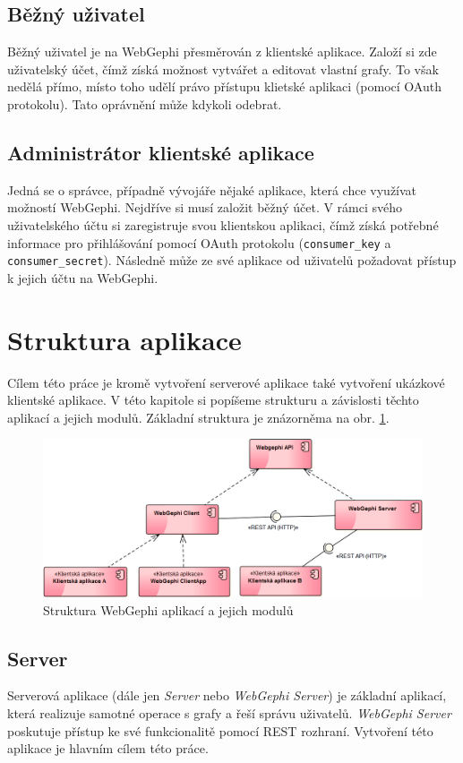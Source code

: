 \documentclass[thesis=M,czech]{FITthesis}[2014/05/6]
\begin{document}
\subsection{Běžný uživatel}
Běžný uživatel je na WebGephi přesměrován z klientské aplikace. Založí si zde uživatelský účet, čímž získá možnost vytvářet a editovat vlastní grafy. To však nedělá přímo,
místo toho udělí právo  přístupu klietské aplikaci (pomocí OAuth protokolu). Tato oprávnění může kdykoli odebrat.

\subsection{Administrátor klientské aplikace}
Jedná se o správce, případně vývojáře nějaké aplikace, která chce využívat možností WebGephi. Nejdříve si musí založit běžný účet. V rámci svého
uživatelského účtu si zaregistruje svou klientskou aplikaci, čímž získá potřebné informace pro přihlášování pomocí OAuth protokolu (\texttt{consumer\_key} a \texttt{consumer\_secret}).
Následně může ze své aplikace od uživatelů požadovat přístup k jejich účtu na WebGephi.

\section{Struktura aplikace}
Cílem této práce je kromě vytvoření serverové aplikace také vytvoření ukázkové klientské aplikace. V této kapitole si popíšeme strukturu a
závislosti těchto aplikací a jejich modulů. Základní struktura je znázorněma na obr. \ref{fig:modules}.

\begin{figure}\centering
 	\includegraphics[width=1\textwidth]{images/diagram/modules}
 	\caption[Struktura WebGephi modulů]{Struktura WebGephi aplikací a jejich modulů}\label{fig:modules}
\end{figure}


\subsection{Server}
Serverová aplikace (dále jen \textit{Server} nebo \textit{WebGephi Server}) je základní aplikací, která realizuje samotné operace s grafy a řeší správu uživatelů.
\textit{WebGephi Server} poskutuje přístup ke své funkcionalitě pomocí REST rozhraní. Vytvoření této aplikace je hlavním cílem této práce.
\end{document}
